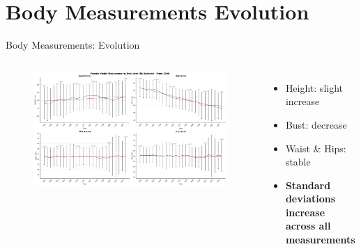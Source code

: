 \documentclass[aspectratio=169,xcolor=dvipsnames,10pt]{beamer}
\begin{document}
\section{Body Measurements Evolution}

\begin{frame}{Body Measurements: Evolution}
    \begin{columns}
            \begin{figure}
                    \begin{center}
                    \includegraphics[width=\textwidth]{figures/evolution_female_eu_from_2000.png}
                    \end{center}
                \end{figure}

            \raggedright
            \begin{itemize}
                \setlength{\itemsep}{0.6em}
                \pause \item Height: slight increase
                \item Bust: decrease
                \item Waist \& Hips: stable
            \pause
            \vspace{1.2em}
            \item[] \begin{block}{}\textbf{Standard deviations increase across all measurements}
            \end{block}
            \end{itemize}
        \end{columns}
\end{frame}
\end{document}
